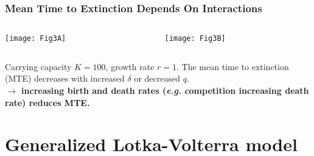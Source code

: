 \documentclass[dvipsnames]{beamer}
\begin{document}
\begin{frame}
\frametitle{Mean Time to Extinction Depends On Interactions}
\begin{columns}
	\begin{column}{5.4cm}
		\begin{center}
			\texttt{[image: Fig3A]}%
		\end{center}
	\end{column}
	\begin{column}{5.4cm}
		\begin{center}
			\texttt{[image: Fig3B]}%
		\end{center}
	\end{column}
\end{columns}
\vspace{0.2cm}
\justifying
Carrying capacity $K=100$, growth rate $r=1$. 
The mean time to extinction (MTE) decreases with increased $\delta$ or decreased $q$. \\
\pause
\vspace{0.2cm}
\textbf{$\rightarrow$ increasing birth and death rates (\emph{e.g.} competition increasing death rate) reduces MTE.} 
\end{frame}


\section[Fixation]{Generalized Lotka-Volterra model}
\end{document}
